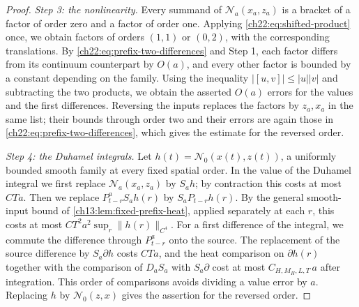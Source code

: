 \begin{proof}
\emph{Step 3: the nonlinearity.} Every summand of $\mathcal N_a(x_a,z_a)$ is a bracket of a factor of order zero and a factor of order one. Applying \eqref{ch22:eq:shifted-product} once, we obtain factors of orders $(1,1)$ or $(0,2)$, with the corresponding translations. By \eqref{ch22:eq:prefix-two-differences} and Step 1, each factor differs from its continuum counterpart by $O(a)$, and every other factor is bounded by a constant depending on the family. Using the inequality $|[u,v]|\le|u||v|$ and subtracting the two products, we obtain the asserted $O(a)$ errors for the values and the first differences. Reversing the inputs replaces the factors by $z_a,x_a$ in the same list; their bounds through order two and their errors are again those in \eqref{ch22:eq:prefix-two-differences}, which gives the estimate for the reversed order.

\emph{Step 4: the Duhamel integrals.} Let $h(t)=\mathcal N_0(x(t),z(t))$, a uniformly bounded smooth family at every fixed spatial order. In the value of the Duhamel integral we first replace $\mathcal N_a(x_a,z_a)$ by $S_ah$; by contraction this costs at most $CTa$. Then we replace $P_{t-r}^aS_ah(r)$ by $S_aP_{t-r}h(r)$. By the general smooth-input bound of \cref{ch13:lem:fixed-prefix-heat}, applied separately at each $r$, this costs at most $CT^2a^2\sup_r\|h(r)\|_{C^4}$. For a first difference of the integral, we commute the difference through $P_{t-r}^a$ onto the source. The replacement of the source difference by $S_a\partial h$ costs $CTa$, and the heat comparison on $\partial h(r)$ together with the comparison of $D_aS_a$ with $S_a\partial$ cost at most $C_{H,M_H,L,T}\,a$ after integration. This order of comparisons avoids dividing a value error by $a$. Replacing $h$ by $\mathcal N_0(z,x)$ gives the assertion for the reversed order.


\end{proof}

